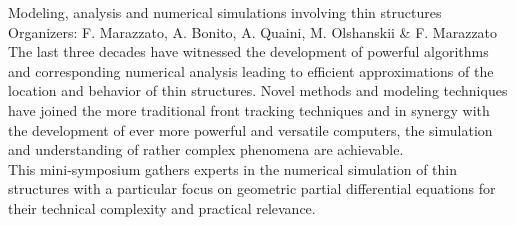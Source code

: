 \label{mini04}

\miniabs
{Modeling, analysis and numerical simulations involving thin structures}
{Organizers: F. Marazzato, A. Bonito, A. Quaini, M. Olshanskii \& F. Marazzato}
{The last three decades have witnessed the development of powerful algorithms and corresponding numerical analysis leading to efficient approximations of the location and behavior of thin structures. Novel methods and modeling techniques have joined the more traditional front tracking techniques and in synergy with the development of ever more powerful and versatile computers, the simulation and understanding of rather complex phenomena are achievable.\\
This mini-symposium gathers experts in the numerical simulation of thin structures with a particular focus on geometric partial differential equations for their technical complexity and practical relevance.}

